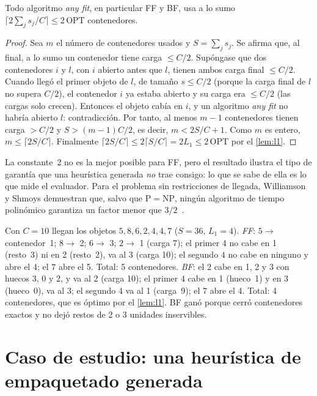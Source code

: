 \begin{teorema}\label{teo:anyfit}
Todo algoritmo \emph{any fit}, en particular FF y BF, usa a lo sumo $\lceil 2\sum_j s_j/C\rceil\le 2\,\mathrm{OPT}$ contenedores.
\end{teorema}

\begin{proof}
Sea $m$ el número de contenedores usados y $S=\sum_j s_j$. Se afirma que, al final, a lo sumo un contenedor tiene carga $\le C/2$. Supóngase que dos contenedores $i$ y $l$, con $i$ abierto antes que $l$, tienen ambos carga final $\le C/2$. Cuando llegó el primer objeto de $l$, de tamaño $s\le C/2$ (porque la carga final de $l$ no supera $C/2$), el contenedor $i$ ya estaba abierto y su carga era $\le C/2$ (las cargas solo crecen). Entonces el objeto cabía en $i$, y un algoritmo \emph{any fit} no habría abierto $l$: contradicción. Por tanto, al menos $m-1$ contenedores tienen carga $>C/2$ y $S>(m-1)C/2$, es decir, $m<2S/C+1$. Como $m$ es entero, $m\le\lceil 2S/C\rceil$. Finalmente $\lceil 2S/C\rceil\le 2\lceil S/C\rceil=2L_1\le 2\,\mathrm{OPT}$ por el \cref{lem:l1}.
\end{proof}

La constante~2 no es la mejor posible para FF, pero el resultado ilustra el tipo de garantía que una heurística generada \emph{no} trae consigo: lo que se sabe de ella es lo que mide el evaluador. Para el problema sin restricciones de llegada, Williamson y Shmoys demuestran que, salvo que $\mathrm{P}=\mathrm{NP}$, ningún algoritmo de tiempo polinómico garantiza un factor menor que $3/2$~\cite[§3.3]{ws}.

\begin{ejemplo}\label{ej:ff-bf}
Con $C=10$ llegan los objetos $5,8,6,2,4,4,7$ ($S=36$, $L_1=4$). \emph{FF}: $5\to$ contenedor~1; $8\to$ 2; $6\to$ 3; $2\to$ 1 (carga 7); el primer $4$ no cabe en 1 (resto~3) ni en 2 (resto~2), va al 3 (carga 10); el segundo $4$ no cabe en ninguno y abre el 4; el $7$ abre el 5. Total: 5 contenedores. \emph{BF}: el $2$ cabe en 1, 2 y 3 con huecos $3$, $0$ y $2$, y va al 2 (carga 10); el primer $4$ cabe en 1 (hueco~1) y en 3 (hueco~0), va al 3; el segundo $4$ va al 1 (carga~9); el $7$ abre el 4. Total: 4 contenedores, que es óptimo por el \cref{lem:l1}. BF ganó porque cerró contenedores exactos y no dejó restos de 2 o 3 unidades inservibles.
\end{ejemplo}

\section{Caso de estudio: una heurística de empaquetado generada}

